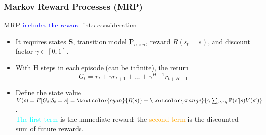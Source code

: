 \documentclass{article}
\begin{document}
\subsubsection{Markov Reward Processes (MRP)}
MRP \textcolor{blue}{includes the reward} into consideration.
\begin{itemize}
\item It requires states $\mathbf{S}$, transition model $\mathbf{P}_{n \times n}$, reward $R(s_t = s)$, and discount factor $\gamma \in [0, 1]$. 
\item With H steps in each episode (can be infinite), the return
    \begin{equation*}
      G_t = r_t + \gamma r_{t+1} + … + \gamma^{H-1} r_{t+H-1}
    \end{equation*} 
\item Define the state value $V(s) = E[G_t | S_t = s] = \textcolor{cyan}{R(s)} + \textcolor{orange}{\gamma \sum_{s' \in S} \mathbb{P}(s' | s) V(s')}$.
    \\\textcolor{cyan}{The first term} is the immediate reward; the \textcolor{orange}{second term} is the discounted sum of future rewards.
\end{itemize}
\end{document}
